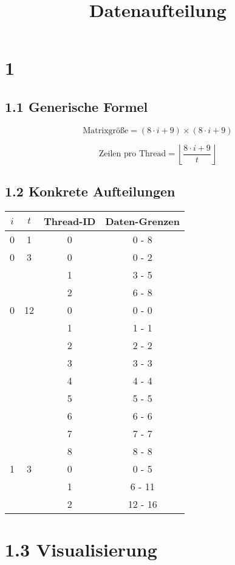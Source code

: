\documentclass{article}
\title{Datenaufteilung}
\author{}
\date{}
\begin{document}
\maketitle

\section*{1}

\subsection*{1.1 Generische Formel}

\[
\text{Matrixgröße} = (8 \cdot i + 9) \times (8 \cdot i + 9)
\]

\[
\text{Zeilen pro Thread} = \left\lfloor \frac{8 \cdot i + 9}{t} \right\rfloor
\]

\subsection*{1.2 Konkrete Aufteilungen}

\begin{tabular}{|c|c|c|c|}
\hline
$i$ & $t$ & Thread-ID & Daten-Grenzen \\
\hline
0 & 1 & 0 & 0 - 8 \\
\hline
0 & 3 & 0 & 0 - 2 \\
  &   & 1 & 3 - 5 \\
  &   & 2 & 6 - 8 \\
\hline
0 & 12 & 0 & 0 - 0 \\
  &    & 1 & 1 - 1 \\
  &    & 2 & 2 - 2 \\
  &    & 3 & 3 - 3 \\
  &    & 4 & 4 - 4 \\
  &    & 5 & 5 - 5 \\
  &    & 6 & 6 - 6 \\
  &    & 7 & 7 - 7 \\
  &    & 8 & 8 - 8 \\
\hline
1 & 3 & 0 & 0 - 5 \\
  &   & 1 & 6 - 11 \\
  &   & 2 & 12 - 16 \\
\hline
\end{tabular}

\section*{1.3 Visualisierung}
\end{document}
